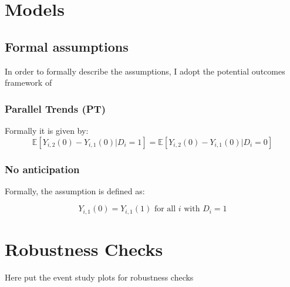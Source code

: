 \documentclass[12pt]{article}
\begin{document}
\section{Models}\label{app:models}

\subsection{Formal assumptions}\label{app:models:assumptions}
In order to formally describe the assumptions, I adopt the potential outcomes framework of~\cite{rubinEstimatingCausalEffects1974}

\subsubsection{Parallel Trends (PT)}

Formally it is given by: 
\begin{equation}
    \mathbb{E}[Y_{i,2}(0) - Y_{i,1}(0) | D_i = 1] = \mathbb{E}[Y_{i,2}(0) - Y_{i,1}(0) | D_i = 0]
\end{equation}

\subsubsection{No anticipation}
Formally, the assumption is defined as:

\begin{equation}
    Y_{i,1}(0) = Y_{i,1}(1) \text{ for all } i \text{ with } D_i = 1
\end{equation}



\section{Robustness Checks}\label{app:robustness}

Here put the event study plots for robustness checks
\end{document}
